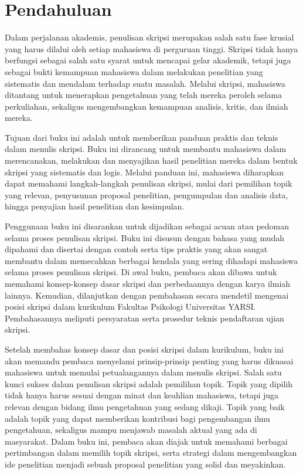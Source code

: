 \documentclass[
  letterpaper,
  DIV=11,
  numbers=noendperiod]{scrreprt}
\author{}
\date{}
\begin{document}
\chapter*{Pendahuluan}\label{pendahuluan}

Dalam perjalanan akademis, penulisan skripsi merupakan salah satu fase
krusial yang harus dilalui oleh setiap mahasiswa di perguruan tinggi.
Skripsi tidak hanya berfungsi sebagai salah satu syarat untuk mencapai
gelar akademik, tetapi juga sebagai bukti kemampuan mahasiswa dalam
melakukan penelitian yang sistematis dan mendalam terhadap suatu
masalah. Melalui skripsi, mahasiswa ditantang untuk menerapkan
pengetahuan yang telah mereka peroleh selama perkuliahan, sekaligus
mengembangkan kemampuan analisis, kritis, dan ilmiah mereka.

Tujuan dari buku ini adalah untuk memberikan panduan praktis dan teknis
dalam menulis skripsi. Buku ini dirancang untuk membantu mahasiswa dalam
merencanakan, melakukan dan menyajikan hasil penelitian mereka dalam
bentuk skripsi yang sistematis dan logis. Melalui panduan ini, mahasiswa
diharapkan dapat memahami langkah-langkah penulisan skripsi, mulai dari
pemilihan topik yang relevan, penyusunan proposal penelitian,
pengumpulan dan analisis data, hingga penyajian hasil penelitian dan
kesimpulan.

Penggunaan buku ini disarankan untuk dijadikan sebagai acuan atau
pedoman selama proses penulisan skripsi. Buku ini disusun dengan bahasa
yang mudah dipahami dan disertai dengan contoh serta tips praktis yang
akan sangat membantu dalam memecahkan berbagai kendala yang sering
dihadapi mahasiswa selama proses penulisan skripsi. Di awal buku,
pembaca akan dibawa untuk memahami konsep-konsep dasar skripsi dan
perbedaannya dengan karya ilmiah lainnya. Kemudian, dilanjutkan dengan
pembahasan secara mendetil mengenai posisi skripsi dalam kurikulum
Fakultas Psikologi Universitas YARSI. Pembahasannya meliputi persyaratan
serta prosedur teknis pendaftaran ujian skripsi.

Setelah membahas konsep dasar dan posisi skripsi dalam kurikulum, buku
ini akan memandu pembaca menyelami prinsip-prinsip penting yang harus
dikuasai mahasiswa untuk memulai petualangannya dalam menulis skripsi.
Salah satu kunci sukses dalam penulisan skripsi adalah pemilihan topik.
Topik yang dipilih tidak hanya harus sesuai dengan minat dan keahlian
mahasiswa, tetapi juga relevan dengan bidang ilmu pengetahuan yang
sedang dikaji. Topik yang baik adalah topik yang dapat memberikan
kontribusi bagi pengembangan ilmu pengetahuan, sekaligus mampu menjawab
masalah aktual yang ada di masyarakat. Dalam buku ini, pembaca akan
diajak untuk memahami berbagai pertimbangan dalam memilih topik skripsi,
serta strategi dalam mengembangkan ide penelitian menjadi sebuah
proposal penelitian yang solid dan meyakinkan.
\end{document}

